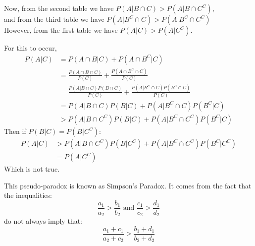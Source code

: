 \documentclass[../Main.tex]{subfiles}
\begin{document}
Now, from the second table we have $P(A | B \cap C) > P(A | B \cap C^C)$,\\
and from the third table we have $P(A | B^C \cap C) > P(A | B^C \cap C^C)$\\
However, from the first table we have $P(A | C) > P(A | C^C)$.\par
For this to occur,
\begin{align*}
    P(A | C) &= P(A \cap B | C) + P(A \cap B^C | C) \\
    &= \frac{P(A \cap B \cap C)}{P(C)} + \frac{P(A \cap B^C \cap C)}{P(C)} \\
    &= \frac{P(A | B \cap C)P(B \cap C)}{P(C)} + \frac{P(A | B^C \cap C)P(B^C \cap C)}{P(C)} \\
    &= P(A | B \cap C)P(B | C) + P(A | B^C \cap C)P(B^C | C) \\
    &> P(A | B \cap C^C)P(B | C) + P(A | B^C \cap C^C) P(B^C | C)
\end{align*} 
Then if $P(B|C) = P(B | C^C)$:
\begin{align*}
    P(A | C) &> P(A | B \cap C^C) P(B | C^C) + P(A | B^C \cap C^C) P(B^C | C^C) \\
    &= P(A | C^C)
\end{align*}
Which is not true.\par %
This pseudo-paradox is known as Simpson's Paradox. It comes from the fact that the inequalities:
\begin{equation*}
    \frac{a_1}{a_2} > \frac{b_1}{b_2} \text{ and } \frac{c_1}{c_2} > \frac{d_1}{d_2}
\end{equation*}
do not always imply that:
\begin{equation*}
    \frac{a_1 + c_1}{a_2 + c_2} > \frac{b_1 + d_1}{b_2 + d_2}
\end{equation*}
\end{document}
